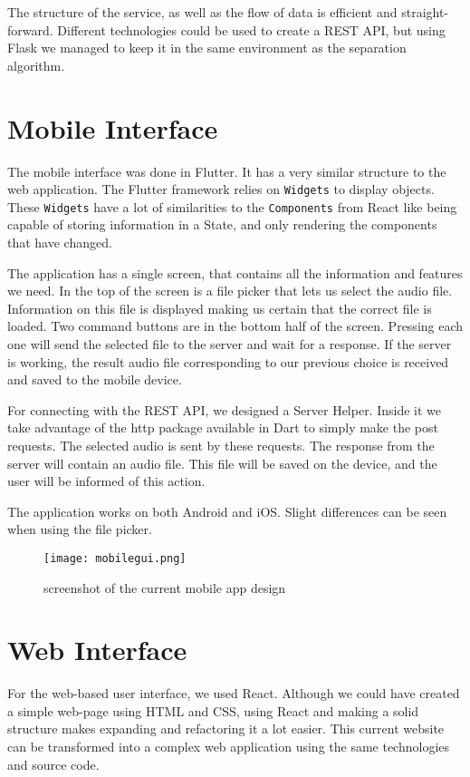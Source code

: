 \documentclass[../Thesis.tex]{subfiles}
\begin{document}
The structure of the service, as well as the flow of data is efficient and straight-forward. Different technologies could be used to create a REST API, but using Flask we managed to keep it in the same environment as the separation algorithm.

\section {Mobile Interface}

The mobile interface was done in Flutter. It has a very similar structure to the web application. The Flutter framework relies on \texttt{Widgets} to display objects. These \texttt{Widgets} have a lot of similarities to the \texttt{Components} from React like being capable of storing information in a State, and only rendering the components that have changed. 

The application has a single screen, that contains all the information and features we need. In the top of the screen is a file picker that lets us select the audio file. Information on this file is displayed making us certain that the correct file is loaded. Two command buttons are in the bottom half of the screen. Pressing each one will send the selected file to the server and wait for a response. If the server is working, the result audio file corresponding to our previous choice is received and saved to the mobile device. 

For connecting with the REST API, we designed a Server Helper. Inside it we take advantage of the http package available in Dart to simply make the post requests. The selected audio is sent by these requests. The response from the server will contain an audio file. This file will be saved on the device, and the user will be informed of this action. 

The application works on both Android and iOS. Slight differences can be seen when using the file picker. 

\begin{figure}[h]
\centering
\label {fig: mobile}
\texttt{[image: mobilegui.png]}
\caption[width=0.5\textwidth]{screenshot of the current mobile app design}
\end{figure}

\section {Web Interface}

For the web-based user interface, we used React. Although we could have created a simple web-page using HTML and CSS, using React and making a solid structure makes expanding and refactoring it a lot easier. This current website can be transformed into a complex web application using the same technologies and source code. 
\end{document}
